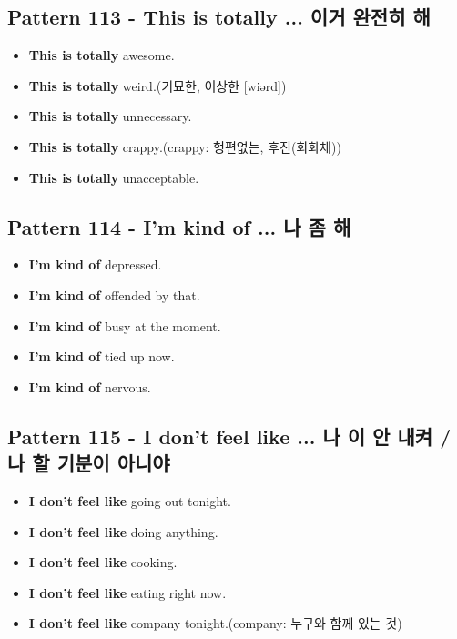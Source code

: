\documentclass[11pt]{oblivoir}
\begin{document}
\subsection{Pattern 113 - This is totally ... 이거 완전히 \texttildelow 해}
\begin{itemize}
  \item \textbf{This is totally} awesome.
  \item \textbf{This is totally} weird.(기묘한, 이상한  [wiərd])
  \item \textbf{This is totally} unnecessary.
  \item \textbf{This is totally} crappy.(crappy: 형편없는, 후진(회화체))
  \item \textbf{This is totally} unacceptable.
\end{itemize}

\subsection{Pattern 114 - I'm kind of ... 나 좀 \texttildelow 해}
\begin{itemize}
  \item \textbf{I'm kind of} depressed.
  \item \textbf{I'm kind of} offended by that.
  \item \textbf{I'm kind of} busy at the moment.
  \item \textbf{I'm kind of} tied up now.
  \item \textbf{I'm kind of} nervous.
\end{itemize}

\subsection{Pattern 115 - I don't feel like ... 나 \texttildelow 이 안 내켜 / 나 \texttildelow 할 기분이 아니야}
\begin{itemize}
  \item \textbf{I don't feel like} going out tonight.
  \item \textbf{I don't feel like} doing anything.
  \item \textbf{I don't feel like} cooking.
  \item \textbf{I don't feel like} eating right now.
  \item \textbf{I don't feel like} company tonight.(company: 누구와 함께 있는 것)
\end{itemize}
\end{document}
